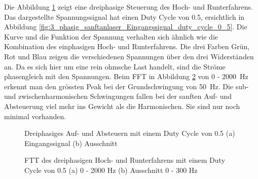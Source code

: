 Die Abbildung \ref{fig:drei_phasiges_Sanft_anlassen} zeigt eine dreiphasige Steuerung des Hoch- und Runterfahrens. Das dargestellte Spannungssignal hat einen Duty Cycle von 0.5, ersichtlich in Abbildung \ref{fig:3_phasig_sanftanlaser_Eingangssignal_duty_cycle_0_5}. Die Kurve und die Funktion der Spannung verhalten sich ähnlich wie die Kombination des einphasigen Hoch- und Runterfahrens. Die drei Farben Grün, Rot und Blau zeigen die verschiedenen Spannungen über den drei Widerständen an. Da es sich hier um eine rein ohmsche Last handelt, sind die Ströme phasengleich mit den Spannungen. Beim FFT in Abbildung \ref{fig:dreiphasiges_Sanft_anlassen_FTT} von 0 - \SI{2000}{Hz} erkennt man den grössten Peak bei der Grundschwingung von \SI{50}{Hz}. Die sub- und zwischenharmonischen Schwingungen fallen bei der sanften Auf- und Absteuerung viel mehr ins Gewicht als die Harmonischen. Sie sind nur noch minimal vorhanden.   


\begin{figure}[ht!]
	\centering
	\qquad
	\caption{Dreiphasiges Auf- und Absteuern mit einem Duty Cycle von 0.5 (a) Eingangssignal (b) Ausschnitt}
	\label{fig:drei_phasiges_Sanft_anlassen}
\end{figure}

\begin{figure}[ht!]
	\centering
	\qquad
	\caption{FTT des dreiphasigen Hoch- und Runterfahrens mit einem Duty Cycle von 0.5 (a) 0 - 2000 Hz (b) Ausschnitt 0 - 300 Hz}
	\label{fig:dreiphasiges_Sanft_anlassen_FTT}
\end{figure}

\newpage



